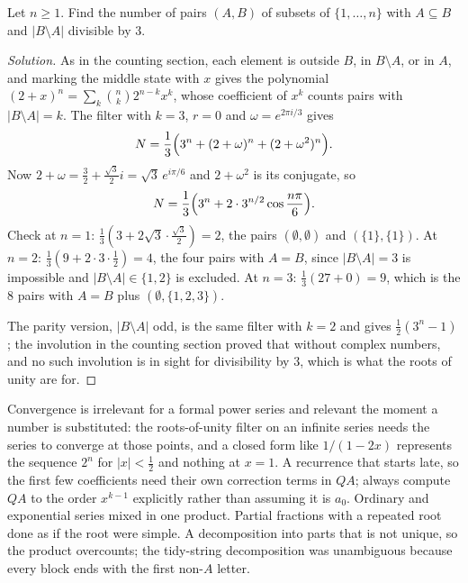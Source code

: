 \begin{example}
Let $n\ge1$. Find the number of pairs $(A,B)$ of subsets of $\{1,\dots,n\}$ with $A\subseteq B$ and $|B\setminus A|$ divisible by $3$.
\end{example}

\begin{proof}[Solution]
As in the counting section, each element is outside $B$, in $B\setminus A$, or in $A$, and marking the middle state with $x$ gives the polynomial $(2+x)^n=\sum_k\binom nk2^{n-k}x^k$, whose coefficient of $x^k$ counts pairs with $|B\setminus A|=k$. The filter with $k=3$, $r=0$ and $\omega=e^{2\pi i/3}$ gives
\[
N=\frac13\Bigl(3^n+(2+\omega)^n+(2+\omega^2)^n\Bigr).
\]
Now $2+\omega=\tfrac32+\tfrac{\sqrt3}2i=\sqrt3\,e^{i\pi/6}$ and $2+\omega^2$ is its conjugate, so
\[
N=\frac13\Bigl(3^n+2\cdot3^{n/2}\cos\frac{n\pi}6\Bigr).
\]
Check at $n=1$: $\frac13(3+2\sqrt3\cdot\frac{\sqrt3}2)=2$, the pairs $(\emptyset,\emptyset)$ and $(\{1\},\{1\})$. At $n=2$: $\frac13(9+2\cdot3\cdot\frac12)=4$, the four pairs with $A=B$, since $|B\setminus A|=3$ is impossible and $|B\setminus A|\in\{1,2\}$ is excluded. At $n=3$: $\frac13(27+0)=9$, which is the $8$ pairs with $A=B$ plus $(\emptyset,\{1,2,3\})$.

The parity version, $|B\setminus A|$ odd, is the same filter with $k=2$ and gives $\frac12(3^n-1)$; the involution in the counting section proved that without complex numbers, and no such involution is in sight for divisibility by $3$, which is what the roots of unity are for.
\end{proof}

\begin{trap}
Convergence is irrelevant for a formal power series and relevant the moment a number is substituted: the roots-of-unity filter on an infinite series needs the series to converge at those points, and a closed form like $1/(1-2x)$ represents the sequence $2^n$ for $|x|<\tfrac12$ and nothing at $x=1$. A recurrence that starts late, so the first few coefficients need their own correction terms in $QA$; always compute $QA$ to the order $x^{k-1}$ explicitly rather than assuming it is $a_0$. Ordinary and exponential series mixed in one product. Partial fractions with a repeated root done as if the root were simple. A decomposition into parts that is not unique, so the product overcounts; the tidy-string decomposition was unambiguous because every block ends with the first non-$A$ letter.
\end{trap}

